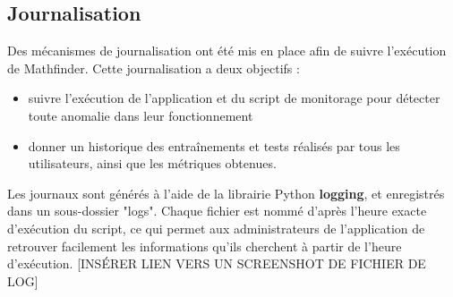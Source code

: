 \documentclass[french]{article}
\begin{document}
    \subsection{Journalisation}
    Des mécanismes de journalisation ont été mis en place afin de suivre l'exécution de Mathfinder. Cette journalisation a deux objectifs :
    \begin{itemize}
        \item suivre l'exécution de l'application et du script de monitorage pour détecter toute anomalie dans leur fonctionnement
        \item donner un historique des entraînements et tests réalisés par tous les utilisateurs, ainsi que les métriques obtenues.
    \end{itemize}
    Les journaux sont générés à l'aide de la librairie Python \textbf{logging}, et enregistrés dans un sous-dossier "logs". Chaque fichier est nommé d'après l'heure exacte d'exécution du script, ce qui permet aux administrateurs de l'application de retrouver facilement les informations qu'ils cherchent à partir de l'heure d'exécution.
    [INSÉRER LIEN VERS UN SCREENSHOT DE FICHIER DE LOG]
\end{document}
